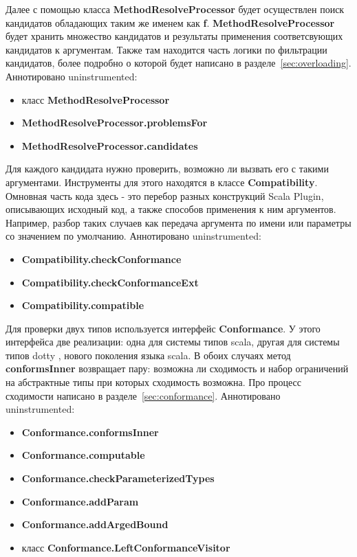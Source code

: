 Далее с помощью класса \textbf{MethodResolveProcessor} будет осуществлен
поиск кандидатов обладающих таким же именем как \textbf{f}.
\textbf{MethodResolveProcessor} будет хранить множество кандидатов и
результаты применения соответсвующих кандидатов к аргументам.
Также там находится часть логики по фильтрации кандидатов, более подробно о которой
будет написано в разделе~\ref{sec:overloading}.
Аннотировано uninstrumented:
\begin{itemize}
  \item класс \textbf{MethodResolveProcessor}
  \item \textbf{MethodResolveProcessor.problemsFor}
  \item \textbf{MethodResolveProcessor.candidates}
\end{itemize}

Для каждого кандидата нужно проверить, возможно ли вызвать его с такими аргументами.
Инструменты для этого находятся в классе \textbf{Compatibility}.
Омновная часть кода здесь - это перебор разных конструкций Scala Plugin,
описывающих исходный код, а также способов применения к ним аргументов.
Например, разбор таких случаев как передача аргумента по имени или параметры со
значением по умолчанию.
Аннотировано uninstrumented:
\begin{itemize}
  \item \textbf{Compatibility.checkConformance}
  \item \textbf{Compatibility.checkConformanceExt}
  \item \textbf{Compatibility.compatible}
\end{itemize}

Для проверки двух типов используется интерфейс \textbf{Conformance}.
У этого интерфейса две реализации: одна для системы типов scala, другая для
системы типов dotty \cite{dotty}, нового поколения языка scala.
В обоих случаях метод \textbf{conformsInner} возвращает пару: возможна ли
сходимость и набор ограничений на абстрактные типы при которых сходимость
возможна.
Про процесс сходимости написано в разделе~\ref{sec:conformance}.
Аннотировано uninstrumented:
\begin{itemize}
  \item \textbf{Conformance.conformsInner}
  \item \textbf{Conformance.computable}
  \item \textbf{Conformance.checkParameterizedTypes}
  \item \textbf{Conformance.addParam}
  \item \textbf{Conformance.addArgedBound}
  \item класс \textbf{Conformance.LeftConformanceVisitor}
\end{itemize}


